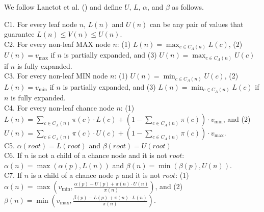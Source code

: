\documentclass[letterpaper]{article} %
\newcommand{\MM}{\mathit{V}}
\newcommand{\pess}{\mathit{L}}
\newcommand{\opti}{\mathit{U}}
\newcommand{\vmax}{v_{\text{max}}}
\newcommand{\vmin}{v_{\text{min}}}
\newcommand{\rootnode}{\mathit{root}}
\begin{document}
We follow Lanctot et al. (\citeyear{lanctot2013monte}) and define $\opti$, $\pess$, $\alpha$, and $\beta$ as follows. 

\noindent C1. For every leaf node $n$, $\pess(n)$ and $\opti(n)$ can be any pair of values that guarantee $\pess(n)\leq \MM(n)\leq \opti(n)$.\\ 

\noindent C2. For every non-leaf MAX node $n$: 
(1) $\pess(n)=\max_{c\in C_A(n)} \pess(c)$,
(2) $\opti(n)=\vmax$ if $n$ is partially expanded, and 
(3) $\opti(n)=\max_{c\in C_A(n)} \opti(c)$ if $n$ is fully expanded.\\

\noindent C3. For every non-leaf MIN node $n$:
(1) $\opti(n)=\min_{c\in C_A(n)} \opti(c)$, 
(2) $\pess(n)=\vmin$ if $n$ is partially expanded, and 
(3) $\pess(n)=\min_{c\in C_A(n)} \pess(c)$ if $n$ is fully expanded.\\

\noindent C4. For every non-leaf chance node $n$: 
(1) $\pess(n)= \sum_{c\in C_A(n)} \pi(c)\cdot \pess(c) + 
(1-\sum_{c\in C_A(n)} \pi(c))\cdot \vmin{}$, and 
(2) $\opti(n)= \sum_{c\in C_A(n)} \pi(c)\cdot \opti(c) + 
(1-\sum_{c\in C_A(n)} \pi(c))\cdot \vmax{}$. \\

\noindent C5. $\alpha(\rootnode)=\pess(\rootnode)$ and $\beta(\rootnode)=\opti(\rootnode)$ \\

\noindent C6. If $n$ is not a child of a chance node and it is not $\rootnode$:
$\alpha(n)=\max(\alpha(p),\pess(n))$ and 
$\beta(n)=\min(\beta(p),\opti(n))$. \\

\noindent C7. If $n$ is a child of a chance node $p$ and it is not $\rootnode$:
(1) $\alpha(n) = \max(\vmin, \frac{\alpha(p)-\opti(p)+\pi(n)\cdot\opti(n)}{\pi(n)})$, 
and (2) $\beta(n) = \min(\vmax, \frac{\beta(p)-\pess(p)+\pi(n)\cdot\pess(n)}{\pi(n)})$.\\
\end{document}
